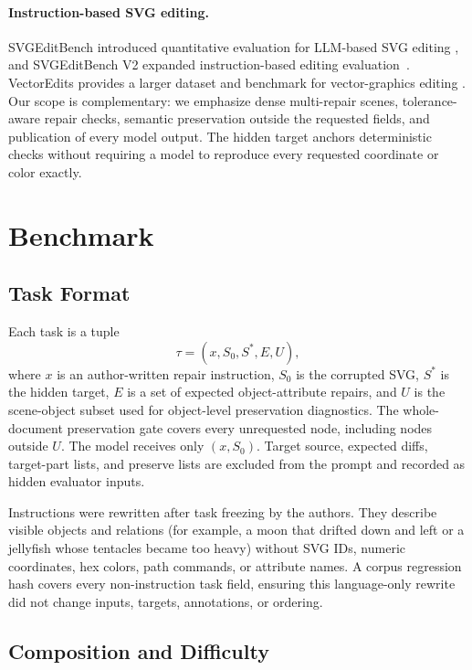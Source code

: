 \documentclass[11pt]{article}
\begin{document}
\paragraph{Instruction-based SVG editing.}
SVGEditBench introduced quantitative evaluation for LLM-based SVG editing
\citep{nishina2024svgeditbench}, and SVGEditBench V2 expanded instruction-based
editing evaluation~\citep{nishina2025svgeditbenchv2}. VectorEdits provides a
larger dataset and benchmark for vector-graphics editing
\citep{kuchar2025vectoredits}. Our scope is complementary: we emphasize dense
multi-repair scenes, tolerance-aware repair checks, semantic preservation outside
the requested fields, and publication of every model output. The hidden target
anchors deterministic checks without requiring a model to reproduce every
requested coordinate or color exactly.

\section{Benchmark}
\label{sec:benchmark}

\subsection{Task Format}

Each task is a tuple
\[
  \tau = (x, S_0, S^*, E, U),
\]
where $x$ is an author-written repair instruction, $S_0$ is the corrupted SVG, $S^*$ is
the hidden target, $E$ is a set of expected object-attribute repairs, and $U$ is
the scene-object subset used for object-level preservation diagnostics. The
whole-document preservation gate covers every unrequested node, including nodes
outside $U$. The model receives only $(x,S_0)$.
Target source, expected diffs, target-part lists, and preserve lists are excluded
from the prompt and recorded as hidden evaluator inputs.

Instructions were rewritten after task freezing by the authors. They describe visible objects
and relations (for example, a moon that drifted down and left or a jellyfish
whose tentacles became too heavy) without SVG IDs, numeric coordinates, hex
colors, path commands, or attribute names. A corpus regression hash covers every
non-instruction task field, ensuring this language-only rewrite did not change
inputs, targets, annotations, or ordering.

\subsection{Composition and Difficulty}
\end{document}
